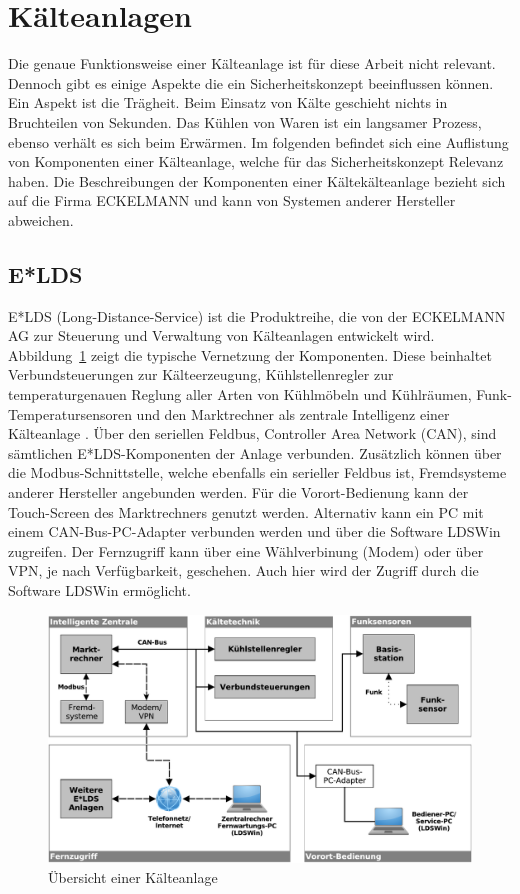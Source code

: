 \documentclass[11pt,a4paper]{report}
\begin{document}
\section{Kälteanlagen}

Die genaue Funktionsweise einer Kälteanlage ist für diese Arbeit nicht relevant. Dennoch gibt es einige Aspekte die ein Sicherheitskonzept beeinflussen können. Ein Aspekt ist die Trägheit. Beim Einsatz von Kälte geschieht nichts in Bruchteilen von Sekunden. Das Kühlen von Waren ist ein langsamer Prozess, ebenso verhält es sich beim Erwärmen. Im folgenden befindet sich eine Auflistung von Komponenten einer Kälteanlage, welche für das Sicherheitskonzept Relevanz haben. Die Beschreibungen der Komponenten einer Kältekälteanlage bezieht sich auf die Firma ECKELMANN und kann von Systemen anderer Hersteller abweichen.

\subsection{E*LDS}

E*LDS (Long-Distance-Service) ist die Produktreihe, die von der ECKELMANN AG zur Steuerung und Verwaltung von Kälteanlagen entwickelt wird. Abbildung~\ref{fig:kaelteanlage} zeigt die typische Vernetzung der Komponenten. Diese beinhaltet Verbundsteuerungen zur Kälteerzeugung, Kühlstellenregler zur temperaturgenauen Reglung aller Arten von Kühlmöbeln und Kühlräumen, Funk-Temperatursensoren und den Marktrechner als zentrale Intelligenz einer Kälteanlage \cite{elds}. Über den seriellen Feldbus, Controller Area Network (CAN), sind sämtlichen E*LDS-Komponenten der Anlage verbunden. Zusätzlich können über die Modbus-Schnittstelle, welche ebenfalls ein serieller Feldbus ist, Fremdsysteme anderer Hersteller angebunden werden. Für die Vorort-Bedienung kann der Touch-Screen des Marktrechners genutzt werden. Alternativ kann ein PC mit einem CAN-Bus-PC-Adapter verbunden werden und über die Software LDSWin zugreifen. Der Fernzugriff kann über eine Wählverbinung (Modem) oder über VPN, je nach Verfügbarkeit, geschehen. Auch hier wird der Zugriff durch die Software LDSWin ermöglicht.

\begin{figure}[htbp]
\centering
\includegraphics[scale=0.65]{images/kaelteanlage_uebersicht.pdf}
\caption{Übersicht einer Kälteanlage}
\label{fig:kaelteanlage}
\end{figure}
\end{document}
